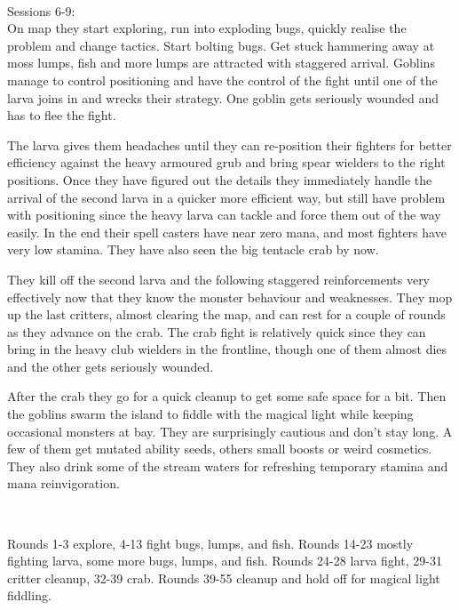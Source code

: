 \


Sessions 6-9:\\                                  %
On map they start exploring, run into exploding bugs, quickly realise the problem and change tactics. Start bolting bugs. Get stuck hammering away at moss lumps, fish and more lumps are attracted with staggered arrival. Goblins manage to control positioning and have the control of the fight until one of the larva joins in and wrecks their strategy. One goblin gets seriously wounded and has to flee the fight.

The larva gives them headaches until they can re-position their fighters for better efficiency against the heavy armoured grub and bring spear wielders to the right positions. Once they have figured out the details they immediately handle the arrival of the second larva in a quicker more efficient way, but still have problem with positioning since the heavy larva can tackle and force them out of the way easily. In the end their spell casters have near zero mana, and most fighters have very low stamina. They have also seen the big tentacle crab by now.

They kill off the second larva and the following staggered reinforcements very effectively now that they know the monster behaviour and weaknesses. They mop up the last critters, almost clearing the map, and can rest for a couple of rounds as they advance on the crab. The crab fight is relatively quick since they can bring in the heavy club wielders in the frontline, though one of them almost dies and the other gets seriously wounded.

After the crab they go for a quick cleanup to get some safe space for a bit. Then the goblins swarm the island to fiddle with the magical light while keeping occasional monsters at bay. They are surprisingly cautious and don't stay long. A few of them get mutated ability seeds, others small boosts or weird cosmetics. They also drink some of the stream waters for refreshing temporary stamina and mana reinvigoration.

\

Rounds 1-3 explore, 4-13 fight bugs, lumps, and fish.                       %
Rounds 14-23 mostly fighting larva, some more bugs, lumps, and fish.        %
Rounds 24-28 larva fight, 29-31 critter cleanup, 32-39 crab.                %
Rounds 39-55 cleanup and hold off for magical light fiddling.               %


